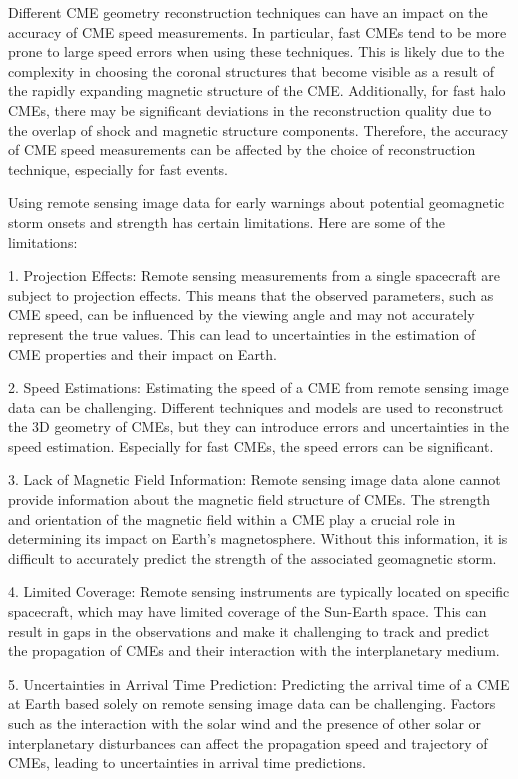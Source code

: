 Different CME geometry reconstruction techniques can have an impact on the accuracy of CME speed measurements. In particular, fast CMEs tend to be more prone to large speed errors when using these techniques. This is likely due to the complexity in choosing the coronal structures that become visible as a result of the rapidly expanding magnetic structure of the CME. Additionally, for fast halo CMEs, there may be significant deviations in the reconstruction quality due to the overlap of shock and magnetic structure components. Therefore, the accuracy of CME speed measurements can be affected by the choice of reconstruction technique, especially for fast events.

Using remote sensing image data for early warnings about potential geomagnetic storm onsets and strength has certain limitations. Here are some of the limitations:

1. Projection Effects: Remote sensing measurements from a single spacecraft are subject to projection effects. This means that the observed parameters, such as CME speed, can be influenced by the viewing angle and may not accurately represent the true values. This can lead to uncertainties in the estimation of CME properties and their impact on Earth.

2. Speed Estimations: Estimating the speed of a CME from remote sensing image data can be challenging. Different techniques and models are used to reconstruct the 3D geometry of CMEs, but they can introduce errors and uncertainties in the speed estimation. Especially for fast CMEs, the speed errors can be significant.

3. Lack of Magnetic Field Information: Remote sensing image data alone cannot provide information about the magnetic field structure of CMEs. The strength and orientation of the magnetic field within a CME play a crucial role in determining its impact on Earth's magnetosphere. Without this information, it is difficult to accurately predict the strength of the associated geomagnetic storm.

4. Limited Coverage: Remote sensing instruments are typically located on specific spacecraft, which may have limited coverage of the Sun-Earth space. This can result in gaps in the observations and make it challenging to track and predict the propagation of CMEs and their interaction with the interplanetary medium.

5. Uncertainties in Arrival Time Prediction: Predicting the arrival time of a CME at Earth based solely on remote sensing image data can be challenging. Factors such as the interaction with the solar wind and the presence of other solar or interplanetary disturbances can affect the propagation speed and trajectory of CMEs, leading to uncertainties in arrival time predictions.

